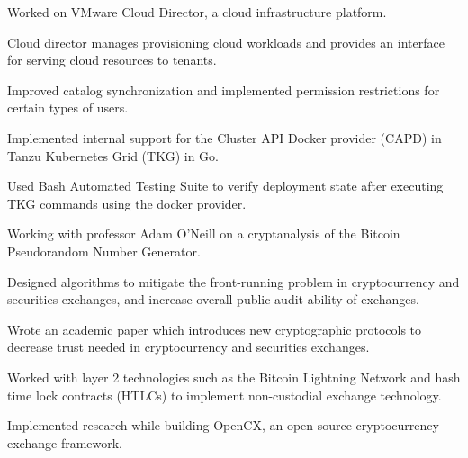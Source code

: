 
\begin{tightemize}
    \item Worked on VMware Cloud Director, a cloud infrastructure platform.
    \item Cloud director manages provisioning cloud workloads and provides an
        interface for serving cloud resources to tenants.
    \item Improved catalog synchronization and implemented permission
        restrictions for certain types of users.
\end{tightemize}
\subsectionsep

\begin{tightemize}
    \item Implemented internal support for the Cluster API Docker provider
        (CAPD) in Tanzu Kubernetes Grid (TKG) in Go.
    \item Used Bash Automated Testing Suite to verify deployment state after
        executing TKG commands using the docker provider.
\end{tightemize}
\subsectionsep

\begin{tightemize}
    \item Working with professor Adam O'Neill on a cryptanalysis of the Bitcoin
        Pseudorandom Number Generator.
\end{tightemize}
\subsectionsep

\begin{tightemize}
  \item Designed algorithms to mitigate the front-running problem in
      cryptocurrency and securities exchanges, and increase overall
      public audit-ability of exchanges.
  \item Wrote an academic paper which introduces new cryptographic protocols to
      decrease trust needed in cryptocurrency and securities exchanges.
  \item Worked with layer 2 technologies such as the Bitcoin Lightning
      Network and hash time lock contracts (HTLCs) to implement
      non-custodial exchange technology.
  \item Implemented research while building OpenCX, an open source
      cryptocurrency exchange framework.
\end{tightemize}
\subsectionsep

